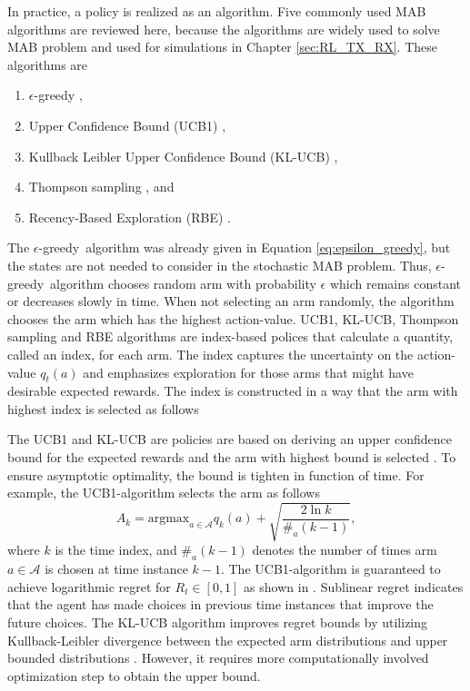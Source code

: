 \documentclass[english, 12pt, a4paper, elec, utf8, a-1b, online]{aaltothesis}
\newcommand{\As}{\mathcal{A}}
\newcommand{\argmax}{\text{argmax}}
\newcommand{\egreedy}{$\epsilon$-greedy~}
\begin{document}
In practice, a policy is realized as an algorithm.
Five commonly used MAB algorithms are reviewed here, because the algorithms are widely used to solve MAB problem and used for simulations in Chapter \ref{sec:RL_TX_RX}.
These algorithms are
\begin{enumerate}
    \item $\epsilon$-greedy \cite{Lattimore2019},
    \item Upper Confidence Bound (UCB1) \cite{Auer2002, Aurelien2008},
    \item Kullback Leibler Upper Confidence Bound (KL-UCB) \cite{Garivier2011},
    \item Thompson sampling \cite{Agrawal2012, Raj2017}, and
    \item Recency-Based Exploration (RBE) \cite{Oksanen2015,Oksanen2017}.
\end{enumerate}
The \egreedy algorithm was already given in Equation \eqref{eq:epsilon_greedy}, but the states are not needed to consider in the stochastic MAB problem.
Thus, \egreedy algorithm chooses random arm with probability $\epsilon$ which remains constant or decreases slowly in time. 
When not selecting an arm randomly, the algorithm chooses the arm which has the highest action-value.
UCB1, KL-UCB, Thompson sampling and RBE algorithms are index-based polices that calculate a quantity, called an index, for each arm.
The index captures the uncertainty on the action-value $q_t(a)$ and emphasizes exploration for those arms that might have desirable expected rewards.
The index is constructed in a way that the arm with highest index is selected as follows

The UCB1 and KL-UCB are policies are based on deriving an upper confidence bound for the expected rewards and the arm with highest bound is selected \cite{Sutton2018, Garivier2011}.
To ensure asymptotic optimality, the bound is tighten in function of time.
For example, the UCB1-algorithm selects the arm as follows \cite{Auer2002}
\begin{equation}
    A_k = \argmax_{a \in \As} q_k(a) + \sqrt{\frac{2 \ln{k}}{\#_a(k-1)}},
\end{equation}
where $k$ is the time index, and $\#_a(k-1)$ denotes the number of times arm $a \in \As$ is chosen at time instance $k-1$.
The UCB1-algorithm is guaranteed to achieve logarithmic regret for $R_t \in [0, 1]$ as shown in \cite{Auer2002}.
Sublinear regret indicates that the agent has made choices in previous time instances that improve the future choices.
The KL-UCB algorithm improves regret bounds by utilizing Kullback-Leibler divergence between the expected arm distributions and upper bounded distributions \cite{Garivier2011}.
However, it requires more computationally involved optimization step to obtain the upper bound.
\end{document}
